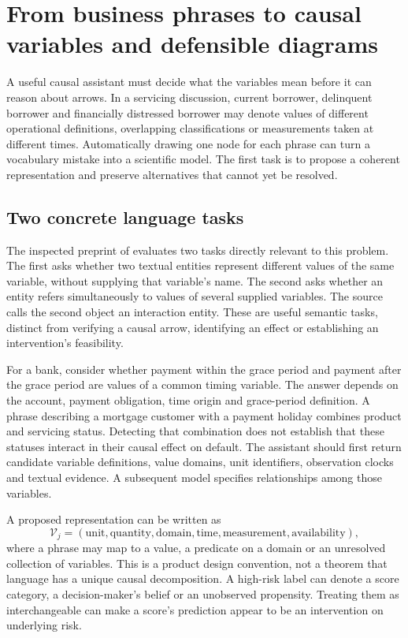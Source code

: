 \section[From business phrases to causal variables]{From business phrases to causal variables and defensible diagrams}
\label{sec:exec28-cm}

A useful causal assistant must decide what the variables mean before it can reason about arrows. In a servicing discussion, current borrower, delinquent borrower and financially distressed borrower may denote values of different operational definitions, overlapping classifications or measurements taken at different times. Automatically drawing one node for each phrase can turn a vocabulary mistake into a scientific model. The first task is to propose a coherent representation and preserve alternatives that cannot yet be resolved.

\subsection{Two concrete language tasks}

The inspected preprint of \citet{exec28_cm_razouk} evaluates two tasks directly relevant to this problem. The first asks whether two textual entities represent different values of the same variable, without supplying that variable's name. The second asks whether an entity refers simultaneously to values of several supplied variables. The source calls the second object an interaction entity. These are useful semantic tasks, distinct from verifying a causal arrow, identifying an effect or establishing an intervention's feasibility.

For a bank, consider whether payment within the grace period and payment after the grace period are values of a common timing variable. The answer depends on the account, payment obligation, time origin and grace-period definition. A phrase describing a mortgage customer with a payment holiday combines product and servicing status. Detecting that combination does not establish that these statuses interact in their causal effect on default. The assistant should first return candidate variable definitions, value domains, unit identifiers, observation clocks and textual evidence. A subsequent model specifies relationships among those variables.

A proposed representation can be written as
\begin{equation}
 \mathcal V_j=(\text{unit},\text{quantity},\text{domain},\text{time},
                \text{measurement},\text{availability}),
\end{equation}
where a phrase may map to a value, a predicate on a domain or an unresolved collection of variables. This is a product design convention, not a theorem that language has a unique causal decomposition. A high-risk label can denote a score category, a decision-maker's belief or an unobserved propensity. Treating them as interchangeable can make a score's prediction appear to be an intervention on underlying risk.

